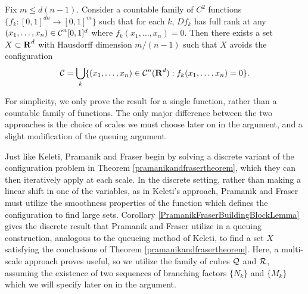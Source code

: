 \begin{theorem} \label{pramanikandfrasertheorem}
    Fix $m \leq d(n-1)$. Consider a countable family of $C^2$ functions $\{ f_k : [0,1]^{dn} \to [0,1]^m \}$ such that for each $k$, $Df_k$ has full rank at any $(x_1, \dots, x_n) \in \operatorname{\mathcal{C}}^n[0,1]^d$ where $f_k(x_1, \dots, x_n) = 0$. Then there exists a set $X \subset \operatorname{\mathbf{R}}^d$ with Hausdorff dimension $m/(n-1)$ such that $X$ avoids the configuration
    \[ \operatorname{\mathcal{C}} = \bigcup_k \{ (x_1, \dots, x_n) \in \operatorname{\mathcal{C}}^n(\operatorname{\mathbf{R}}^d): f_k(x_1, \dots, x_n) = 0 \}. \]
\end{theorem}

\begin{remark}
    For simplicity, we only prove the result for a single function, rather than a countable family of functions. The only major difference between the two approaches is the choice of scales we must choose later on in the argument, and a slight modification of the queuing argument.
\end{remark}

Just like Keleti, Pramanik and Fraser begin by solving a discrete variant of the configuration problem in Theorem \ref{pramanikandfrasertheorem}, which they can then iteratively apply at each scale. In the discrete setting, rather than making a linear shift in one of the variables, as in Keleti's approach, Pramanik and Fraser must utilize the smoothness properties of the function which defines the configuration to find large sets. Corollary \ref{PramanikFraserBuildingBlockLemma} gives the discrete result that Pramanik and Fraser utilize in a queuing construction, analogous to the queueing method of Keleti, to find a set $X$ satisfying the conclusions of Theorem \ref{pramanikandfrasertheorem}. Here, a multi-scale approach proves useful, so we utilize the family of cubes $\operatorname{\mathcal{Q}}$ and $\operatorname{\mathcal{R}}$, assuming the existence of two sequences of branching factors $\{ N_k \}$ and $\{ M_k \}$ which we will specify later on in the argument.

